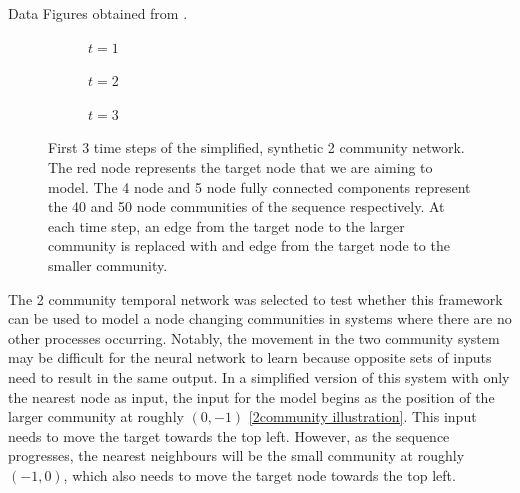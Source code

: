 \documentclass[12pt]{amsbook}
\begin{document}
\begin{chapter}{Data}
        Figures obtained from \cite{Emma2023}.
        \begin{figure}[H]
            \centering
            \centering
            \begin{subfigure}[c]{0.3\textwidth}
                \centering
                \resizebox{.6\width}{!}{}
                \caption{$t=1$}
                \label{2community train series a}
            \end{subfigure}
            \hfill
            \centering
            \begin{subfigure}[c]{0.3\textwidth}
                \centering
                \resizebox{.6\width}{!}{}
                \caption{$t=2$}
                \label{2community train series b}
            \end{subfigure}
            \hfill
            \centering
            \begin{subfigure}[c]{0.3\textwidth}
                \centering
                \resizebox{.6\width}{!}{}
                \caption{$t=3$}
                \label{2community train series c}
            \end{subfigure}
            \caption{First 3 time steps of the simplified, synthetic 2 community network. The red node represents the target node that we are aiming to model. The 4 node and 5 node fully connected components represent the 40 and 50 node communities of the sequence respectively. At each time step, an edge from the target node to the larger community is replaced with and edge from the target node to the smaller community.}
            \label{2community train series}
        \end{figure}
        The 2 community temporal network was selected to test whether this framework can be used to model a node changing communities in systems where there are no other processes occurring. Notably, the movement in the two community system may be difficult for the neural network to learn because opposite sets of inputs need to result in the same output. In a simplified version of this system with only the nearest node as input, the input for the model begins as the position of the larger community at roughly $(0,-1)$ \cref{2community illustration}. This input needs to move the target towards the top left. However, as the sequence progresses, the nearest neighbours will be the small community at roughly $(-1,0)$, which also needs to move the target node towards the top left. 
 


\end{chapter}
\end{document}
